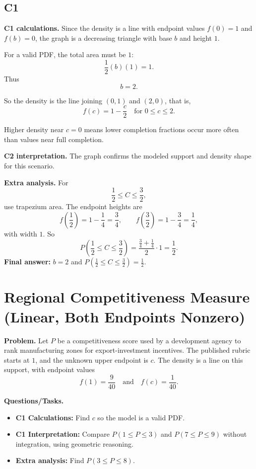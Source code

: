 	\subsection*{C1}
	
	\textbf{C1 calculations.}
	Since the density is a line with endpoint values $f(0)=1$ and $f(b)=0$, the graph is a decreasing triangle with base $b$ and height $1$.
	
	For a valid PDF, the total area must be $1$:
	\[
	\frac12(b)(1)=1.
	\]
	Thus
	\[
	b=2.
	\]
	
	So the density is the line joining $(0,1)$ and $(2,0)$, that is,
	\[
	f(c)=1-\frac{c}{2}\quad\text{for }0\le c\le 2.
	\]
	
	Higher density near $c=0$ means lower completion fractions occur more often than values near full completion.
	
	\textbf{C2 interpretation.}
	The graph confirms the modeled support and density shape for this scenario.
	
	\textbf{Extra analysis.}
	For
	\[
	\frac12\le C\le\frac32,
	\]
	use trapezium area. The endpoint heights are
	\[
	f\!\left(\frac12\right)=1-\frac14=\frac34,
	\qquad
	f\!\left(\frac32\right)=1-\frac34=\frac14,
	\]
	with width $1$. So
	\[
	P\!\left(\frac12\le C\le\frac32\right)
	=
	\frac{\frac34+\frac14}{2}\cdot1
	=
	\frac12.
	\]
	\textbf{Final answer:} $b=2$ and $P\!\left(\frac12\le C\le\frac32\right)=\frac12$.
	\section{Regional Competitiveness Measure (Linear, Both Endpoints Nonzero)}
	
	\textbf{Problem.}
	Let $P$ be a competitiveness score used by a development agency to rank manufacturing zones for export-investment incentives. The published rubric starts at $1$, and the unknown upper endpoint is $c$. The density is a line on this support, with endpoint values
	\[
	f(1)=\frac{9}{40}
	\quad\text{and}\quad
	f(c)=\frac{1}{40}.
	\]
	
	\textbf{Questions/Tasks.}
	\begin{itemize}
		\item \textbf{C1 Calculations:} Find $c$ so the model is a valid PDF.
		\item \textbf{C1 Interpretation:} Compare $P(1\le P\le 3)$ and $P(7\le P\le 9)$ without integration, using geometric reasoning.
		\item \textbf{Extra analysis:} Find $P(3\le P\le 8)$.
	\end{itemize}
	

